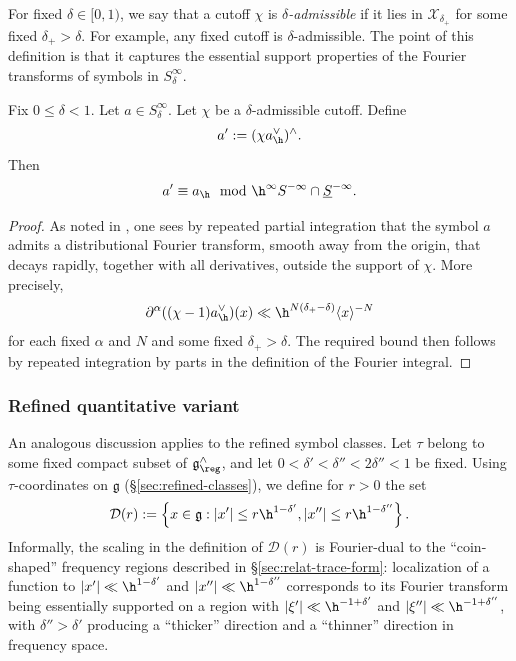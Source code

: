 For fixed $\delta \in [0,1)$, we say that a cutoff $\chi$ is \emph{$\delta$-admissible} if it lies in $\mathcal{X}_{\delta_+}$ for some fixed $\delta_+ > \delta$.  For example, any fixed cutoff is $\delta$-admissible.  The point of this definition is that it captures the essential support properties of the Fourier transforms of symbols in $S_\delta^\infty$.
\begin{lemma}\label{lem:fix-0-leq}
  Fix $0 \leq \delta < 1$.  Let $a \in S_\delta^{\infty}$.  Let $\chi$ be a $\delta$-admissible cutoff.  Define
  \begin{equation}\label{eq:a-:=-chi}
    a' := (\chi a_{\h}^\vee)^\wedge.
  \end{equation}
  Then
  \begin{equation}\label{eq:a-equiv-pmodhinfty}
    a' \equiv a_{\h} \mod{\h^\infty S^{-\infty} \cap \underline{S}^{-\infty}}.
  \end{equation}
\end{lemma}
\begin{proof}
  As noted in \cite[\S8.2]{nelson-venkatesh-1}, one sees by repeated partial integration that the symbol $a$ admits a distributional Fourier transform, smooth away from the origin, that decays rapidly, together with all derivatives, outside the support of $\chi$.  More precisely,
  \begin{equation*}
    \partial^{\alpha} ((\chi - 1) a_{\h}^\vee) (x)
    \ll
    \h^{N(\delta_+ - \delta)} \langle x \rangle^{- N}
  \end{equation*}
  for each fixed $\alpha$ and $N$ and some fixed $\delta_+ > \delta$.    The required bound then follows by repeated integration by parts in the definition of the Fourier integral.
\end{proof}

\subsubsection{Refined quantitative variant}
An analogous discussion applies to the refined symbol classes.  Let $\tau$ belong to some fixed compact subset of $\mathfrak{g}^\wedge_{\reg}$, and let $0 < \delta ' < \delta '' < 2 \delta '' < 1$ be fixed.  Using $\tau$-coordinates on $\mathfrak{g}$ (\S\ref{sec:refined-classes}), we define for $r > 0$ the set
\begin{equation*}
  \mathcal{D} (r) := \left\{ x \in \mathfrak{g} : |x'| \leq r \h^{1 - \delta '}, |x''| \leq r \h^{1 - \delta ''} \right\}.
\end{equation*}
Informally, the scaling in the definition of $\mathcal{D}(r)$ is Fourier-dual to the ``coin-shaped'' frequency regions described in \S\ref{sec:relat-trace-form}: localization of a function to $|x'| \ll \h^{1-\delta'}$ and $|x''| \ll \h^{1-\delta''}$ corresponds to its Fourier transform being essentially supported on a region with $|\xi'| \ll \h^{-1+\delta'}$ and $|\xi''| \ll \h^{-1+\delta''}$, with $\delta''>\delta'$ producing a ``thicker'' direction and a ``thinner'' direction in frequency space.

